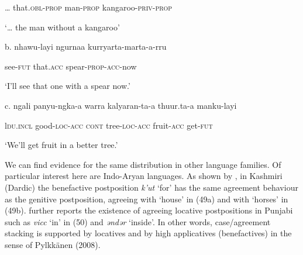 \documentclass[output=paper]{langsci/langscibook}
\begin{document}
\begin{styleSfondomedioiColorexi}
    … that.\textsc{obl-prop}   man-\textsc{prop}   kangaroo-\textsc{priv-prop}
\end{styleSfondomedioiColorexi}

\begin{styleSfondomedioiColorexi}
    ‘… the man without a kangaroo’
\end{styleSfondomedioiColorexi}

\begin{styleSfondomedioiColorexi}
b.   nhawu-layi   ngurnaa  kurryarta-marta-a-rru    
\end{styleSfondomedioiColorexi}

\begin{styleSfondomedioiColorexi}
    see-\textsc{fut}   that.\textsc{acc}   spear-\textsc{prop-acc}{}-now
\end{styleSfondomedioiColorexi}

\begin{styleSfondomedioiColorexi}
    ‘I'll see that one with a spear now.’
\end{styleSfondomedioiColorexi}

\begin{styleSfondomedioiColorexi}
c.  ngali   panyu-ngka-a   warra  kalyaran-ta-a   thuur.ta-a   manku-layi
\end{styleSfondomedioiColorexi}

\begin{styleSfondomedioiColorexi}
    l\textsc{du.incl}   good-\textsc{loc-acc  cont}   tree-\textsc{loc-acc}   fruit-\textsc{acc}   get-\textsc{fut}
\end{styleSfondomedioiColorexi}

\begin{styleSfondomedioiColorexi}
    ‘We'll get fruit in a better tree.’   
\end{styleSfondomedioiColorexi}

\begin{styleSfondomedioiColorexi}
We can find evidence for the same distribution in other language families. Of particular interest here are Indo-Aryan languages. As shown by \citet{Payne1995}, in Kashmiri (Dardic) the benefactive postposition \textit{k’ut} ‘for’ has the same agreement behaviour as the genitive postposition, agreeing with ‘house’ in (49a) and with ‘horses’ in (49b). \citet{Payne1995} further reports the existence of agreeing locative postpositions in Punjabi such as \textit{vicc} ‘in’ in (50) and \textit{ənd}\textit{ər} ‘inside’. In other words, case/agreement stacking is supported by locatives and by high applicatives (benefactives) in the sense of Pylkkänen (2008).
\end{styleSfondomedioiColorexi}
\end{document}
